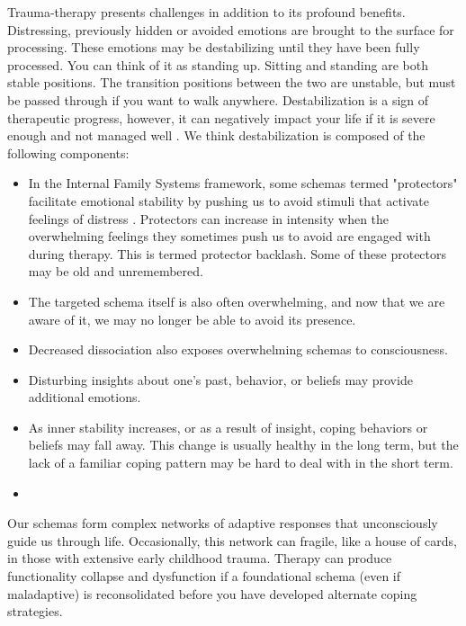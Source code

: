 \documentclass[12pt,letterpaper]{article}
\begin{document}
Trauma-therapy presents challenges in addition to its profound benefits. Distressing, previously hidden or avoided emotions are brought to the surface for processing. These emotions may be destabilizing until they have been fully processed. You can think of it as standing up. Sitting and standing are both stable positions. The transition positions between the two are unstable, but must be passed through if you want to walk anywhere. Destabilization is a sign of therapeutic progress, however, it can negatively impact your life if it is severe enough and not managed well \cite{olthofDestabilization}. We think destabilization is composed of the following components:
\begin{itemize}
    \item In the Internal Family Systems framework, some schemas termed "protectors" facilitate emotional stability by pushing us to avoid stimuli that activate feelings of distress \cite{schwartz2019internal}. Protectors can increase in intensity when the overwhelming feelings they sometimes push us to avoid are engaged with during therapy. This is termed protector backlash. Some of these protectors may be old and unremembered.
    \item The targeted schema itself is also often overwhelming, and now that we are aware of it, we may no longer be able to avoid its presence.
    \item Decreased dissociation also exposes overwhelming schemas to consciousness.
    \item Disturbing insights about one's past, behavior, or beliefs may provide additional emotions.
    \item As inner stability increases, or as a result of insight, coping behaviors or beliefs may fall away. This change is usually healthy in the long term, but the lack of a familiar coping pattern may be hard to deal with in the short term.
    \item {}
\end{itemize}
Our schemas form complex networks of adaptive responses that unconsciously guide us through life. Occasionally, this network can fragile, like a house of cards, in those with extensive early childhood trauma. Therapy can produce functionality collapse and dysfunction if a foundational schema (even if maladaptive) is reconsolidated before you have developed alternate coping strategies.
\end{document}
